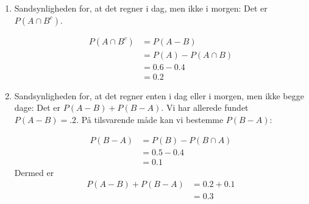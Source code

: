 \begin{example}
\begin{solution}
\begin{enumerate}[label=(\alph*)]
    \item Sandsynligheden for, at det regner i dag, men ikke i morgen: Det er $P\left(A \cap B^c\right)$.

    \begin{align*}
        P(A \cap B^c) &= P(A - B) \\
                      &= P(A) - P(A \cap B) \\
                      &= 0.6 - 0.4 \\
                      &= 0.2
        \end{align*}
        
    \item Sandsynligheden for, at det regner enten i dag eller i morgen, men ikke begge dage: Det er $P(A-B)+P(B-A)$. Vi har allerede fundet $P(A-B)=.2$. På tilsvarende måde kan vi bestemme $P(B-A)$:
    
    \begin{align*}
        P(B-A) & =P(B)-P(B \cap A) \\
        & =0.5-0.4 \\
        & =0.1
        \end{align*}
    Dermed er
    \begin{align*}
        P(A-B)+P(B-A) &= 0.2+0.1 \\
                      &= 0.3
    \end{align*}
\end{enumerate}
\end{solution}
\end{example}
